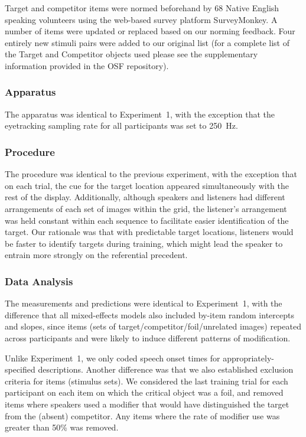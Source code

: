 \documentclass[natbib,doc,a4paper]{apa6}
\begin{document}
Target and competitor items were normed beforehand by 68 Native English speaking volunteers using the web-based survey platform SurveyMonkey. A number of items were updated or replaced based on our norming feedback. Four entirely new stimuli pairs were added to our original list (for a complete list of the Target and Competitor objects used please see the supplementary information provided in the OSF repository).

\subsubsection*{Apparatus}
\label{sec:orgb2f7c48}

The apparatus was identical to Experiment~1, with the exception that the eyetracking sampling rate for all participants was set to 250~Hz.

\subsubsection*{Procedure}
\label{sec:orge167761}

The procedure was identical to the previous experiment, with the exception that on each trial, the cue for the target location appeared simultaneously with the rest of the display.  Additionally, although speakers and listeners had different arrangements of each set of images within the grid, the listener's arrangement was held constant within each sequence to facilitate easier identification of the target. Our rationale was that with predictable target locations, listeners would be faster to identify targets during training, which might lead the speaker to entrain more strongly on the referential precedent.

\subsubsection*{Data Analysis}
\label{sec:org52bada2}

The measurements and predictions were identical to Experiment~1, with the difference that all mixed-effects models also included by-item random intercepts and slopes, since items (sets of target/competitor/foil/unrelated images) repeated across participants and were likely to induce different patterns of modification.

Unlike Experiment~1, we only coded speech onset times for appropriately-specified descriptions. Another difference was that we also established exclusion criteria for items (stimulus sets). We considered the last training trial for each participant on each item on which the critical object was a foil, and removed items where speakers used a modifier that would have distinguished the target from the (absent) competitor. Any items where the rate of modifier use was greater than 50\% was removed.
\end{document}
